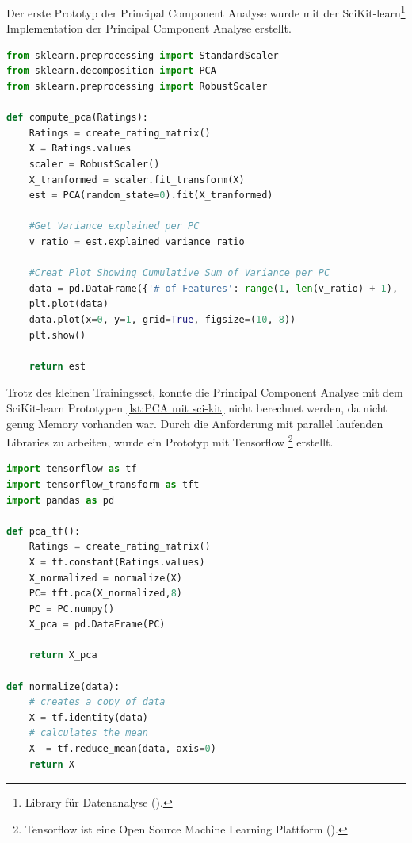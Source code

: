 Der erste Prototyp der Principal Component Analyse wurde mit der SciKit-learn\footnote{Library für Datenanalyse (\cite{scikit-learn}).} Implementation der Principal Component Analyse erstellt.

\begin{lstlisting}[language=Python, caption= Principal Component Analyse mit SciKit-learn,label=lst:PCA mit sci-kit]
from sklearn.preprocessing import StandardScaler
from sklearn.decomposition import PCA
from sklearn.preprocessing import RobustScaler

def compute_pca(Ratings):
    Ratings = create_rating_matrix()
    X = Ratings.values
    scaler = RobustScaler()
    X_tranformed = scaler.fit_transform(X)
    est = PCA(random_state=0).fit(X_tranformed)
    
    #Get Variance explained per PC
    v_ratio = est.explained_variance_ratio_
    
    #Creat Plot Showing Cumulative Sum of Variance per PC
    data = pd.DataFrame({'# of Features': range(1, len(v_ratio) + 1), '% Variance explained': np.cumsum(v_ratio * 100)})
    plt.plot(data)
    data.plot(x=0, y=1, grid=True, figsize=(10, 8))
    plt.show()
    
    return est

\end{lstlisting}

\noindent Trotz des kleinen Trainingsset, konnte die Principal Component Analyse mit dem SciKit-learn Prototypen \ref{lst:PCA mit sci-kit} nicht berechnet werden, da nicht genug Memory vorhanden war. Durch die Anforderung mit parallel laufenden Libraries zu arbeiten, wurde ein Prototyp mit Tensorflow \footnote{Tensorflow ist eine Open Source Machine Learning Plattform (\cite{tensorflow2015-whitepaper}).} erstellt.


\begin{lstlisting}[language=Python, caption= Principal Component Analyse mit Tensorflow, label=lst:PCA mit Tensorflow]
import tensorflow as tf
import tensorflow_transform as tft
import pandas as pd

def pca_tf():
    Ratings = create_rating_matrix()
    X = tf.constant(Ratings.values)
    X_normalized = normalize(X)
    PC= tft.pca(X_normalized,8)
    PC = PC.numpy()
    X_pca = pd.DataFrame(PC)
    
    return X_pca
    
def normalize(data):
    # creates a copy of data
    X = tf.identity(data)
    # calculates the mean
    X -= tf.reduce_mean(data, axis=0)
    return X

\end{lstlisting}

